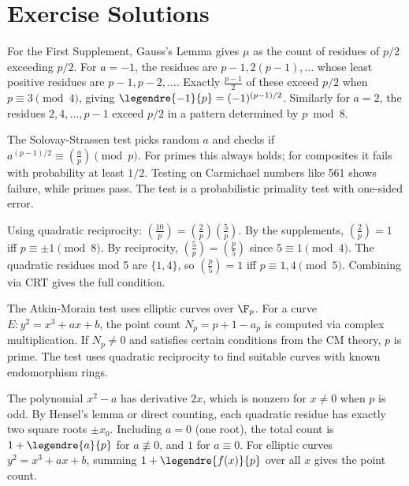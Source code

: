 \section{Exercise Solutions}

\begin{solution}
For the First Supplement, Gauss's Lemma gives $\mu$ as the count of residues of $p/2$ exceeding $p/2$. For $a = -1$, the residues are $p-1, 2(p-1), \ldots$ whose least positive residues are $p-1, p-2, \ldots$. Exactly $\frac{p-1}{2}$ of these exceed $p/2$ when $p \equiv 3 \pmod{4}$, giving $\legendre{-1}{p} = (-1)^{(p-1)/2}$. Similarly for $a = 2$, the residues $2, 4, \ldots, p-1$ exceed $p/2$ in a pattern determined by $p \bmod 8$.
\end{solution}

\begin{solution}
The Solovay-Strassen test picks random $a$ and checks if $a^{(p-1)/2} \equiv \left(\frac{a}{p}\right) \pmod{p}$. For primes this always holds; for composites it fails with probability at least $1/2$. Testing on Carmichael numbers like 561 shows failure, while primes pass. The test is a probabilistic primality test with one-sided error.
\end{solution}

\begin{solution}
Using quadratic reciprocity: $\left(\frac{10}{p}\right) = \left(\frac{2}{p}\right)\left(\frac{5}{p}\right)$. By the supplements, $\left(\frac{2}{p}\right) = 1$ iff $p \equiv \pm 1 \pmod{8}$. By reciprocity, $\left(\frac{5}{p}\right) = \left(\frac{p}{5}\right)$ since $5 \equiv 1 \pmod{4}$. The quadratic residues mod 5 are $\{1, 4\}$, so $\left(\frac{p}{5}\right) = 1$ iff $p \equiv 1, 4 \pmod{5}$. Combining via CRT gives the full condition.
\end{solution}

\begin{solution}
The Atkin-Morain test uses elliptic curves over $\F_p$. For a curve $E: y^2 = x^3 + ax + b$, the point count $N_p = p + 1 - a_p$ is computed via complex multiplication. If $N_p \neq 0$ and satisfies certain conditions from the CM theory, $p$ is prime. The test uses quadratic reciprocity to find suitable curves with known endomorphism rings.
\end{solution}

\begin{solution}
The polynomial $x^2 - a$ has derivative $2x$, which is nonzero for $x \neq 0$ when $p$ is odd. By Hensel's lemma or direct counting, each quadratic residue has exactly two square roots $\pm x_0$. Including $a = 0$ (one root), the total count is $1 + \legendre{a}{p}$ for $a \not\equiv 0$, and $1$ for $a \equiv 0$. For elliptic curves $y^2 = x^3 + ax + b$, summing $1 + \legendre{f(x)}{p}$ over all $x$ gives the point count.
\end{solution}
